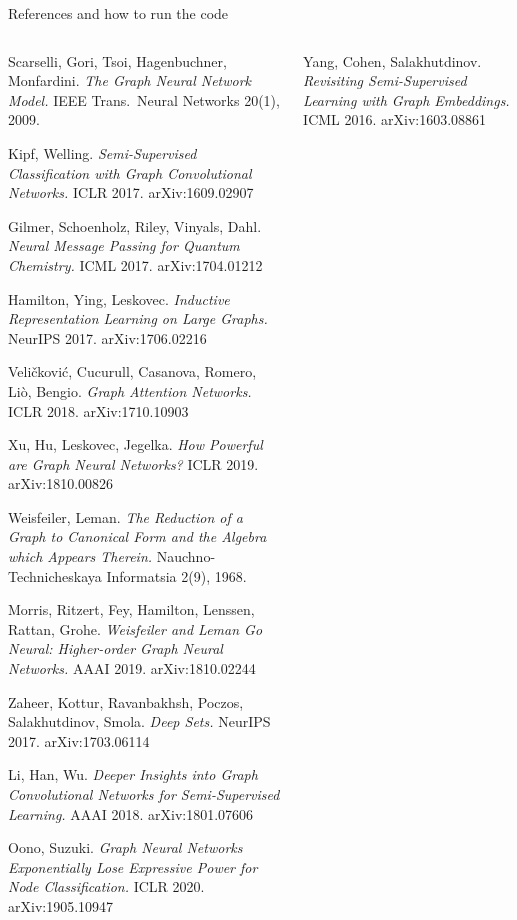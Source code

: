 \documentclass[aspectratio=169,10pt]{beamer}
\begin{document}
\begin{frame}{References and how to run the code}
\fontsize{6.4}{7.9}\selectfont
\begin{columns}[T,onlytextwidth]
\begin{enumerate}[{[1]}]\setlength{\itemsep}{0.6pt}
\item Scarselli, Gori, Tsoi, Hagenbuchner, Monfardini. \emph{The Graph Neural Network Model.} IEEE Trans.\ Neural Networks 20(1), 2009.
\item Kipf, Welling. \emph{Semi-Supervised Classification with Graph Convolutional Networks.} ICLR 2017. arXiv:1609.02907
\item Gilmer, Schoenholz, Riley, Vinyals, Dahl. \emph{Neural Message Passing for Quantum Chemistry.} ICML 2017. arXiv:1704.01212
\item Hamilton, Ying, Leskovec. \emph{Inductive Representation Learning on Large Graphs.} NeurIPS 2017. arXiv:1706.02216
\item Veli\v{c}kovi\'c, Cucurull, Casanova, Romero, Li\`o, Bengio. \emph{Graph Attention Networks.} ICLR 2018. arXiv:1710.10903
\item Xu, Hu, Leskovec, Jegelka. \emph{How Powerful are Graph Neural Networks?} ICLR 2019. arXiv:1810.00826
\item Weisfeiler, Leman. \emph{The Reduction of a Graph to Canonical Form and the Algebra which Appears Therein.} Nauchno-Technicheskaya Informatsia 2(9), 1968.
\item Morris, Ritzert, Fey, Hamilton, Lenssen, Rattan, Grohe. \emph{Weisfeiler and Leman Go Neural: Higher-order Graph Neural Networks.} AAAI 2019. arXiv:1810.02244
\item Zaheer, Kottur, Ravanbakhsh, Poczos, Salakhutdinov, Smola. \emph{Deep Sets.} NeurIPS 2017. arXiv:1703.06114
\item Li, Han, Wu. \emph{Deeper Insights into Graph Convolutional Networks for Semi-Supervised Learning.} AAAI 2018. arXiv:1801.07606
\item Oono, Suzuki. \emph{Graph Neural Networks Exponentially Lose Expressive Power for Node Classification.} ICLR 2020. arXiv:1905.10947
\end{enumerate}
\begin{enumerate}[{[1]}]\setlength{\itemsep}{0.6pt}
\setcounter{enumi}{11}
\item Yang, Cohen, Salakhutdinov. \emph{Revisiting Semi-Supervised Learning with Graph Embeddings.} ICML 2016. arXiv:1603.08861

\end{enumerate}
\end{columns}
\end{frame}
\end{document}
